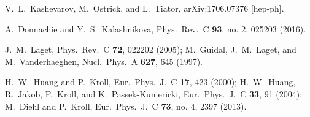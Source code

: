 \documentclass[aps,prc,twocolumn,floatfix,showpacs,preprintnumbers,amsmath,amssymb,superscriptaddress,linenumbers]{revtex4-1}
\begin{document}
\begin{thebibliography}{99}
  V.~L.~Kashevarov, M.~Ostrick, and L.~Tiator,
  arXiv:1706.07376 [hep-ph].

  A.~Donnachie and Y.~S.~Kalashnikova,
  Phys.\ Rev.\ C {\bf 93}, no. 2, 025203 (2016).

  J.~M.~Laget,
  Phys.\ Rev.\ C {\bf 72}, 022202 (2005);
  M.~Guidal, J.~M.~Laget, and M.~Vanderhaeghen,
  Nucl.\ Phys.\ A {\bf 627}, 645 (1997).

  H.~W.~Huang and P.~Kroll,
  Eur.\ Phys.\ J.\ C {\bf 17}, 423 (2000);
  H.~W.~Huang, R.~Jakob, P.~Kroll, and K.~Passek-Kumericki,
  Eur.\ Phys.\ J.\ C {\bf 33}, 91 (2004);
  M.~Diehl and P.~Kroll,
  Eur.\ Phys.\ J.\ C {\bf 73}, no. 4, 2397 (2013).


\end{thebibliography}
\end{document}
